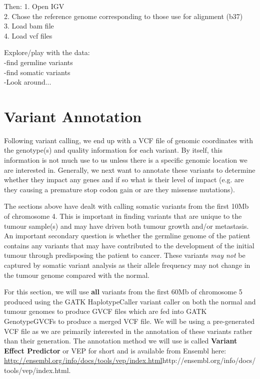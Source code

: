Then:
   1. Open IGV \\
   2. Chose the reference genome corresponding to those use for alignment (b37) \\
   3. Load bam file \\
   4. Load vcf files

Explore/play with the data: \\ 
   -find germline variants \\
   -find somatic variants \\
   -Look around...

\newpage



\section{Variant Annotation}

Following variant calling, we end up with a VCF file of genomic coordinates with the genotype(s) and quality information for each variant. By itself, this information is not much use to us unless there is a specific genomic location we are interested in. Generally, we next want to annotate these variants to determine whether they impact any genes and if so what is their level of impact (e.g. are they causing a premature stop codon gain or are they missense mutations).

The sections above have dealt with calling somatic variants from the first 10Mb of chromosome 4. This is important in finding variants that are unique to the tumour sample(s) and may have driven both tumour growth and/or metastasis. An important secondary question is whether the germline genome of the patient contains any variants that may have contributed to the development of the initial tumour through predisposing the patient to cancer. These variants \textit{may not} be captured by somatic variant analysis as their allele frequency may not change in the tumour genome compared with the normal.

For this section, we will use \textbf{all} variants from the first 60Mb of chromosome 5 produced using the GATK HaplotypeCaller variant caller on both the normal and tumour genomes to produce GVCF files which are fed into GATK GenotypeGVCFs to produce a merged VCF file. We will be using a pre-generated VCF file as we are primarily interested in the annotation of these variants rather than their generation. The annotation method we will use is called \textbf{Variant Effect Predictor} or VEP for short and is available from Ensembl here: \url{http://ensembl.org/info/docs/tools/vep/index.html}{http://ensembl.org/info/docs/tools/vep/index.html}.

